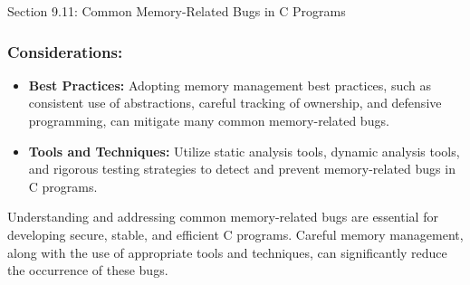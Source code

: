 \begin{notes}{Section 9.11: Common Memory-Related Bugs in C Programs}
    \subsubsection*{Considerations:}
    
    \begin{itemize}
        \item \textbf{Best Practices:} Adopting memory management best practices, such as consistent use of abstractions, careful tracking of ownership, and defensive programming, can mitigate many 
        common memory-related bugs.
        \item \textbf{Tools and Techniques:} Utilize static analysis tools, dynamic analysis tools, and rigorous testing strategies to detect and prevent memory-related bugs in C programs.
    \end{itemize}
    
    Understanding and addressing common memory-related bugs are essential for developing secure, stable, and efficient C programs. Careful memory management, along with the use of appropriate tools 
    and techniques, can significantly reduce the occurrence of these bugs.
\end{notes}